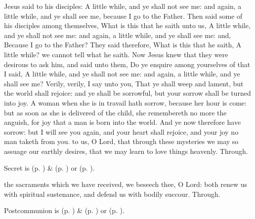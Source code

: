  Jesus said to his disciples: A little while, and ye shall not see me: and again, a little while, and ye shall see me, because I go to the Father. Then said some of his disciples among themselves, What is this that he saith unto us, A little while, and ye shall not see me: and again, a little while, and ye shall see me: and, Because I go to the Father? They said therefore, What is this that he saith, A little while? we cannot tell what he saith. Now Jesus knew that they were desirous to ask him, and said unto them, Do ye enquire among yourselves of that I said, A little while, and ye shall not see me: and again, a little while, and ye shall see me? Verily, verily, I say unto you, That ye shall weep and lament, but the world shall rejoice: and ye shall be sorrowful, but your sorrow shall be turned into joy. A woman when she is in travail hath sorrow, because her hour is come: but as soon as she is delivered of the child, she remembereth no more the anguish, for joy that a man is born into the world. And ye now therefore have sorrow: but I will see you again, and your heart shall rejoice, and your joy no man taketh from you.
\secret
{} to us, O Lord, that through these mysteries we may so assuage our earthly desires, that we may learn to love things heavenly. Through.


\begin{rubric}
     Secret is  (p. \pageref{SPMaryInEaster}) \&   (p. \pageref{SPAgainst}) or  (p. \pageref{SPChiefBishop}).
\end{rubric}
\postcommunion
{} the sacraments which we have received, we beseech thee, O Lord: both renew us with spiritual sustenance, and defend us with bodily succour. Through.
\begin{rubric}
     Postcommunion is  (p. \pageref{SPMaryInEaster}) \&   (p. \pageref{SPAgainst}) or  (p. \pageref{SPChiefBishop}).
\end{rubric}


